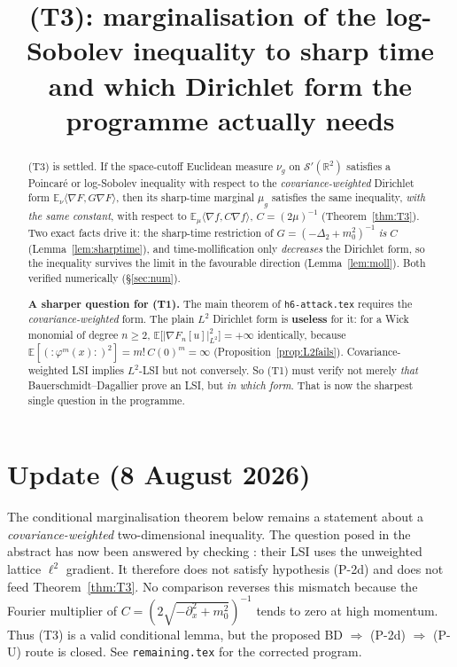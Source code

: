 \documentclass[11pt,a4paper]{article}
\title{(T3): marginalisation of the log-Sobolev inequality to sharp time\\
\large and which Dirichlet form the programme actually needs}
\author{}
\date{}
\theoremstyle{plain}
\theoremstyle{definition}
\newcommand{\R}{\mathbb{R}}
\newcommand{\E}{\mathbb{E}}
\newcommand{\Sw}{\mathcal S'}
\newcommand{\ip}[2]{\langle #1,#2\rangle}
\begin{document}
\maketitle

\begin{abstract}
(T3) is settled. If the space-cutoff Euclidean measure $\nu_g$ on $\Sw(\R^2)$ satisfies a Poincar\'e
or log-Sobolev inequality with respect to the \emph{covariance-weighted} Dirichlet form
$\E_\nu\ip{\nabla F}{G\nabla F}$, then its sharp-time marginal $\mu_g$ satisfies the same
inequality, \emph{with the same constant}, with respect to $\E_\mu\ip{\nabla f}{C\nabla f}$,
$C=(2\mu)^{-1}$ (Theorem~\ref{thm:T3}). Two exact facts drive it: the sharp-time restriction of
$G=(-\Delta_2+m_0^2)^{-1}$ \emph{is} $C$ (Lemma~\ref{lem:sharptime}), and time-mollification only
\emph{decreases} the Dirichlet form, so the inequality survives the limit in the favourable
direction (Lemma~\ref{lem:moll}). Both verified numerically (\S\ref{sec:num}).

\smallskip
\noindent\textbf{A sharper question for (T1).} The main theorem of \texttt{h6-attack.tex} requires
the \emph{covariance-weighted} form. The plain $L^2$ Dirichlet form is \textbf{useless} for it: for
a Wick monomial of degree $n\ge2$, $\E\bigl[|\nabla F_n[u]|_{L^2}^2\bigr]=+\infty$ identically,
because $\E[({:}\varphi^m(x){:})^2]=m!\,C(0)^m=\infty$ (Proposition~\ref{prop:L2fails}).
Covariance-weighted LSI implies $L^2$-LSI but not conversely. So (T1) must verify not merely
\emph{that} Bauerschmidt--Dagallier prove an LSI, but \emph{in which form}. That is now the
sharpest single question in the programme.
\end{abstract}

\section*{Update (8 August 2026)}

The conditional marginalisation theorem below remains a statement about a
\emph{covariance-weighted} two-dimensional inequality.  The question posed in the abstract has
now been answered by checking \cite[Eq.~(1.6) and Thm.~1.1]{BD}: their LSI uses the unweighted
lattice $\ell^2$ gradient.  It therefore does not satisfy hypothesis (P-2d) and does not feed
Theorem~\ref{thm:T3}.  No comparison reverses this mismatch because the Fourier multiplier of
$C=(2\sqrt{-\partial_x^2+m_0^2})^{-1}$ tends to zero at high momentum.  Thus (T3) is a valid
conditional lemma, but the proposed BD $\Rightarrow$ (P-2d) $\Rightarrow$ (P-U) route is closed.
See \texttt{remaining.tex} for the corrected program.
\end{document}

